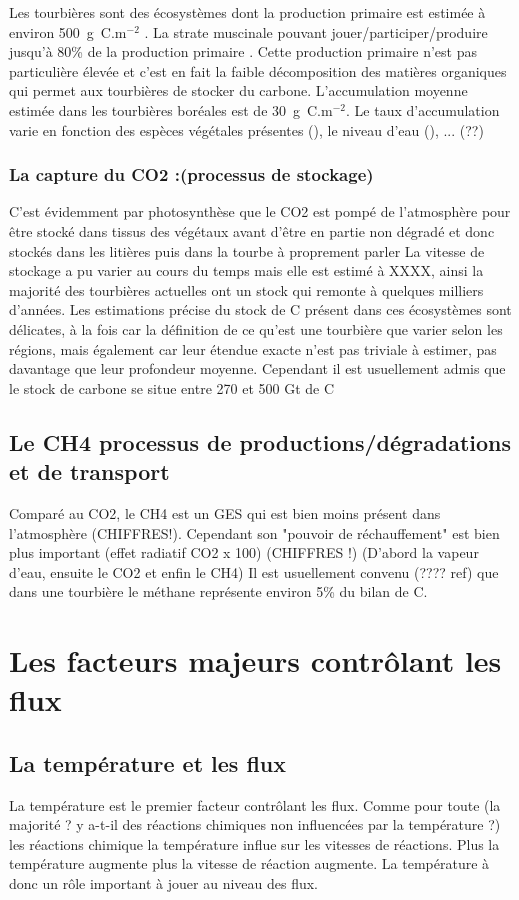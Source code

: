 Les tourbières sont des écosystèmes dont la production primaire est estimée à environ 500~g~C.m$^{-2}$ \cite{francez2000}. 
La strate muscinale pouvant jouer/participer/produire jusqu'à 80\% de la production primaire \cite{francez2000}.
Cette production primaire n'est pas particulière élevée \plop et c'est en fait la faible décomposition des matières organiques qui permet aux tourbières de stocker du carbone.
L'accumulation moyenne estimée dans les tourbières boréales est de 30~g~C.m$^{-2}$. Le taux d'accumulation varie en fonction des espèces végétales présentes (\plop), le niveau d'eau (\plop), ... (??)

\subsubsection{La capture du CO2 :(processus de stockage)}
C'est évidemment par photosynthèse que le CO2 est pompé de l'atmosphère pour être stocké dans tissus des végétaux avant d'être en partie non dégradé et donc stockés dans les litières puis dans la tourbe à proprement parler
La vitesse de stockage a pu varier au cours du temps mais elle est estimé à XXXX, ainsi la majorité des tourbières actuelles ont un stock qui remonte à quelques milliers d'années.
Les estimations précise du stock de C présent dans ces écosystèmes sont délicates, à la fois car la définition de ce qu'est une tourbière que varier selon les régions, mais également car leur étendue exacte n'est pas triviale à estimer, pas davantage que leur profondeur moyenne.
Cependant il est usuellement admis que le stock de carbone se situe entre 270 et 500 Gt de C

\subsection{Le CH4 processus de productions/dégradations et de transport}
Comparé au CO2, le CH4 est un GES qui est bien moins présent dans l'atmosphère (CHIFFRES!).
Cependant son "pouvoir de réchauffement" est bien plus important (effet radiatif CO2 x 100) (CHIFFRES !) (D'abord la vapeur d'eau, ensuite le CO2 et enfin le CH4)
Il est usuellement convenu (???? ref) que dans une tourbière le méthane représente environ 5\% du bilan de C.

\section{Les facteurs majeurs contrôlant les flux}
\subsection{La température et les flux}
La température est le premier facteur contrôlant les flux.
Comme pour toute (la majorité ? y a-t-il des réactions chimiques non influencées par la température ?) les réactions chimique la température influe sur les vitesses de réactions. 
Plus la température augmente plus la vitesse de réaction augmente.
La température à donc un rôle important à jouer au niveau des flux.

